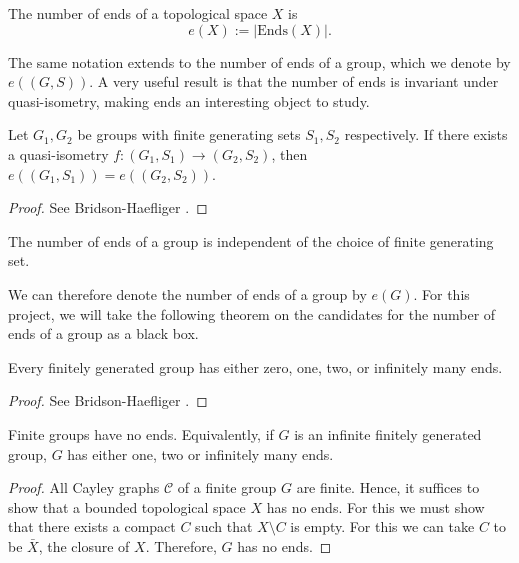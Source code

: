\begin{definition}
    The number of ends of a topological space \(X\) is 
    \[
        e(X) := |\mathrm{Ends}(X)|.
    \]
\end{definition}

The same notation extends to the number of ends of a group, which we denote by \(e((G,S))\). 
A very useful result is that the number of ends is invariant under quasi-isometry, making ends an interesting object to study. 

\begin{theorem}
    Let \(G_1,G_2\) be groups with finite generating sets \(S_1,S_2\) respectively. If there exists a quasi-isometry \(f: (G_1, S_1) \to (G_2,S_2)\), then \(e((G_1,S_1)) = e((G_2,S_2))\).
\end{theorem}

\begin{proof}
    See Bridson-Haefliger \cite[p.~145]{bridson_haefliger_metric_1999}.
\end{proof}

\begin{corollary}
    The number of ends of a group is independent of the choice of finite generating set.
\end{corollary}

We can therefore denote the number of ends of a group by \(e(G)\). For this project, we will take the following theorem on the candidates for the number of ends of a group as a black box.
\begin{theorem}
\label{FH}
    Every finitely generated group has either zero, one, two, or infinitely many ends.
\end{theorem}

\begin{proof}
    See Bridson-Haefliger \cite[p.~146--147]{bridson_haefliger_metric_1999}.
\end{proof}

\begin{corollary}
    Finite groups have no ends. Equivalently, if \(G\) is an infinite finitely generated group, \(G\) has either one, two or infinitely many ends.
\end{corollary}

\begin{proof} %
    All Cayley graphs \(\mathcal{C}\) of a finite group \(G\) are finite. Hence, it suffices to show that a bounded topological space \(X\) has no ends. For this we must show that there exists a compact \(C\) such that \(X \setminus C\) is empty. For this we can take \(C\) to be \(\bar{X}\), the closure of \(X\). Therefore, \(G\) has no ends.
\end{proof}

